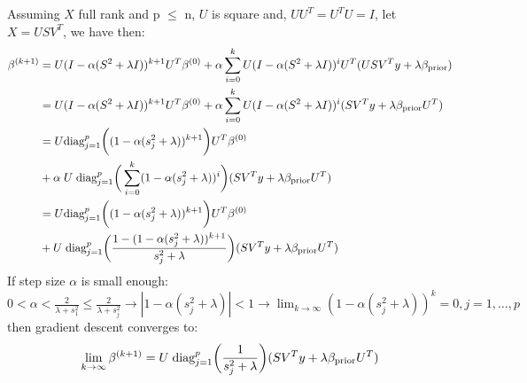 \documentclass[12pt,twoside]{article}
\begin{document}
\begin{enumerate}
Assuming $X$ full rank and p $\le$ n, $U$ is square and, $UU^T = U^TU = I$, let $X = USV^T$, we have then:
\begin{align*}
		\beta^{(k+1)}	&=	U (I - \alpha (S^2 + \lambda I))^{k+1} U^T \beta^{(0)}		+ \alpha \sum_{i=0}^k 	U (I - \alpha (S^2 + \lambda I))^ i U^T (U S V^T y +  \lambda \beta_{\operatorname{prior}}) \\
					&=	U (I - \alpha (S^2 + \lambda I))^{k+1} U^T \beta^{(0)}		+ \alpha \sum_{i=0}^k 	U (I - \alpha (S^2 + \lambda I))^ i (S V^T y + \lambda \beta_{\operatorname{prior}}  U^T) \\
					&=	U \text{diag}_{j=1}^p \bigg( (1 - \alpha (s_j^2 + \lambda))^{k+1} \bigg)U^T \beta^{(0)}	\\
					&+ \alpha \; U  \;  \text{diag}_{j=1}^p \bigg( \sum_{i=0}^k (1 - \alpha (s_j^2 + \lambda))^i \bigg)  (S V^T y + \lambda \beta_{\operatorname{prior}}  U^T) \\
					&= U \text{diag}_{j=1}^p \bigg( (1 - \alpha (s_j^2 + \lambda))^{k+1} \bigg)U^T \beta^{(0)}	\\
					&+ U  \;  \text{diag}_{j=1}^p \bigg( \frac{ 1 - (1 - \alpha (s_j^2 + \lambda))^{k+1}} {s_j^2 + \lambda} \bigg)  (S V^T y + \lambda \beta_{\operatorname{prior}}  U^T)
\end{align*}
If step size $\alpha$ is small enough: $0 < \alpha < \frac{2} {\lambda + s_1^2} \le \frac{2} {\lambda + s_j^2} \rightarrow |1 - \alpha (s_j^2 + \lambda)| < 1 \rightarrow \lim_{k \rightarrow \infty} (1 - \alpha (s_j^2 + \lambda))^k =0, j=1, \dots ,p $ then gradient descent converges to:
$$\lim_{k \rightarrow \infty} \beta^{(k+1)} = U  \;  \text{diag}_{j=1}^p \bigg( \frac{1} {s_j^2 + \lambda} \bigg)  (S V^T y + \lambda \beta_{\operatorname{prior}}  U^T)$$


\end{enumerate}
\end{document}
